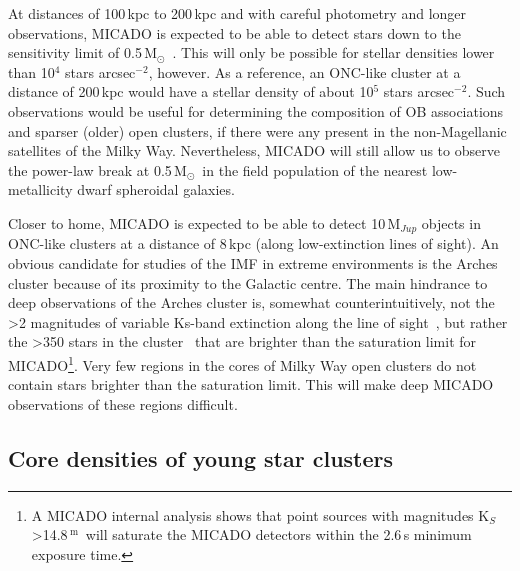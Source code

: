 \documentclass{aa}
\newcommand{\m}{$^\mathrm{m}$~}
\newcommand{\msun}{M$_\odot$~}
\newcommand{\h}[1]{$^{#1}$}
\newcommand{\spae}{stars arcsec$^{-2}$}
\begin{document}
At distances of 100\,kpc to 200\,kpc and with careful photometry and longer observations, MICADO is expected to be able to detect stars down to the sensitivity limit of 0.5\,\msun.
This will only be possible for stellar densities lower than 10\h4 \spae, however.
As a reference, an ONC-like cluster at a distance of 200\,kpc would have a stellar density of about 10\h5 \spae.
Such observations would be useful for determining the composition of OB associations and sparser (older) open clusters, if there were any present in the non-Magellanic satellites of the Milky Way.
Nevertheless, MICADO will still allow us to observe the power-law break at 0.5\,\msun in the field population of the nearest low-metallicity dwarf spheroidal galaxies.

Closer to home, MICADO is expected to be able to detect 10\,M$_{Jup}$ objects in ONC-like clusters at a distance of 8\,kpc (along low-extinction lines of sight).
An obvious candidate for studies of the IMF in extreme environments is the Arches cluster because of its proximity to the Galactic centre.
The main hindrance to deep observations of the Arches cluster is, somewhat counterintuitively, not the \textgreater2 magnitudes of variable Ks-band extinction along the line of sight~\citep{espinoza2009}, but rather the \textgreater350 stars in the cluster~\citep{galacticnucleaus} that are brighter than the saturation limit for MICADO\footnote{A MICADO internal analysis shows that point sources with magnitudes K$_S$\textgreater14.8\,\m will saturate the MICADO detectors within the 2.6\,s minimum exposure time.}.
Very few regions in the cores of Milky Way open clusters do not contain stars brighter than the saturation limit.
This will make deep MICADO observations of these regions difficult.


\subsection{Core densities of young star clusters}
  \label{subsec:core_densities}
\end{document}
